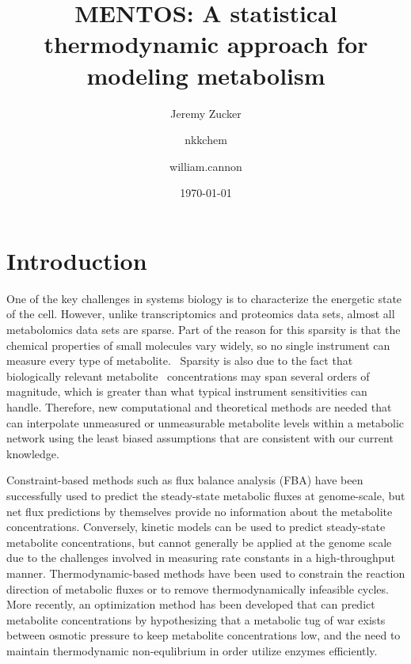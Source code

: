 \documentclass[10pt]{article}
\let\cite\citep
\providecommand\citep{\cite}
\begin{document}
\title{MENTOS: A statistical thermodynamic approach for modeling metabolism}



\author[1]{Jeremy Zucker}%
\author[2]{nkkchem}%
\author[2]{william.cannon}%
%
%


\vspace{-1em}



  \date{\today}


\begingroup
\let\center\flushleft
\let\endcenter\endflushleft
\maketitle
\endgroup








\par\null

\section{Introduction}

One of the key challenges in systems biology is to characterize the
energetic state of the cell. However, unlike transcriptomics and
proteomics data sets, almost all metabolomics data sets are sparse. Part
of the reason for this sparsity is that the chemical properties of small
molecules vary widely, so no single instrument can measure every type of
metabolite.~ Sparsity is also due to the fact that biologically relevant
metabolite ~concentrations may span several orders of magnitude, which
is greater than what typical instrument sensitivities can handle.
Therefore, new computational and theoretical methods are needed that can
interpolate unmeasured or unmeasurable metabolite levels within a
metabolic network using the least biased assumptions that are consistent
with our current knowledge.

Constraint-based methods such as flux balance analysis (FBA) have been
successfully used to predict the steady-state metabolic fluxes at
genome-scale, but net flux predictions by themselves provide no
information about the metabolite concentrations. Conversely, kinetic
models can be used to predict steady-state metabolite concentrations,
but cannot generally be applied at the genome scale due to the
challenges involved in measuring rate constants in a high-throughput
manner. Thermodynamic-based methods have been used to constrain the
reaction direction of metabolic fluxes or to remove thermodynamically
infeasible cycles. More recently, an optimization method has been
developed that can predict metabolite concentrations by hypothesizing
that a metabolic tug of war \cite{Tepper2013} exists between osmotic
pressure to keep metabolite concentrations low, and the need to maintain
thermodynamic non-equlibrium in order utilize enzymes efficiently.
\end{document}
